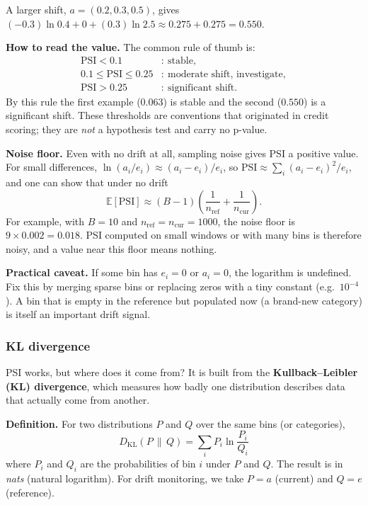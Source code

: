 \documentclass[11pt]{article}
\begin{document}
A larger shift, \(a=(0.2,0.3,0.5)\), gives \((-0.3)\ln0.4+0+(0.3)\ln2.5\approx0.275+0.275=0.550\).

\textbf{How to read the value.} The common rule of thumb is:
\[
\begin{aligned}
\mathrm{PSI}<0.1&:\ \text{stable},\\
0.1\le\mathrm{PSI}\le0.25&:\ \text{moderate shift, investigate},\\
\mathrm{PSI}>0.25&:\ \text{significant shift}.
\end{aligned}
\]
By this rule the first example (\(0.063\)) is stable and the second (\(0.550\)) is a significant shift. These thresholds are conventions that originated in credit scoring; they are \emph{not} a hypothesis test and carry no p-value.

\textbf{Noise floor.} Even with no drift at all, sampling noise gives PSI a positive value. For small differences, \(\ln(a_i/e_i)\approx(a_i-e_i)/e_i\), so \(\mathrm{PSI}\approx\sum_i(a_i-e_i)^2/e_i\), and one can show that under no drift
\[
\mathbb{E}[\mathrm{PSI}]\approx(B-1)\left(\frac{1}{n_{\text{ref}}}+\frac{1}{n_{\text{cur}}}\right).
\]
For example, with \(B=10\) and \(n_{\text{ref}}=n_{\text{cur}}=1000\), the noise floor is \(9\times0.002=0.018\). PSI computed on small windows or with many bins is therefore noisy, and a value near this floor means nothing.

\textbf{Practical caveat.} If some bin has \(e_i=0\) or \(a_i=0\), the logarithm is undefined. Fix this by merging sparse bins or replacing zeros with a tiny constant (e.g.\ \(10^{-4}\)). A bin that is empty in the reference but populated now (a brand-new category) is itself an important drift signal.

\subsubsection{KL divergence}

PSI works, but where does it come from? It is built from the \textbf{Kullback--Leibler (KL) divergence}, which measures how badly one distribution describes data that actually come from another.

\textbf{Definition.} For two distributions \(P\) and \(Q\) over the same bins (or categories),
\[
\boxed{
D_{\mathrm{KL}}(P\,\|\,Q)=\sum_{i}P_i\ln\frac{P_i}{Q_i}
}
\]
where \(P_i\) and \(Q_i\) are the probabilities of bin \(i\) under \(P\) and \(Q\). The result is in \emph{nats} (natural logarithm). For drift monitoring, we take \(P=a\) (current) and \(Q=e\) (reference).
\end{document}
